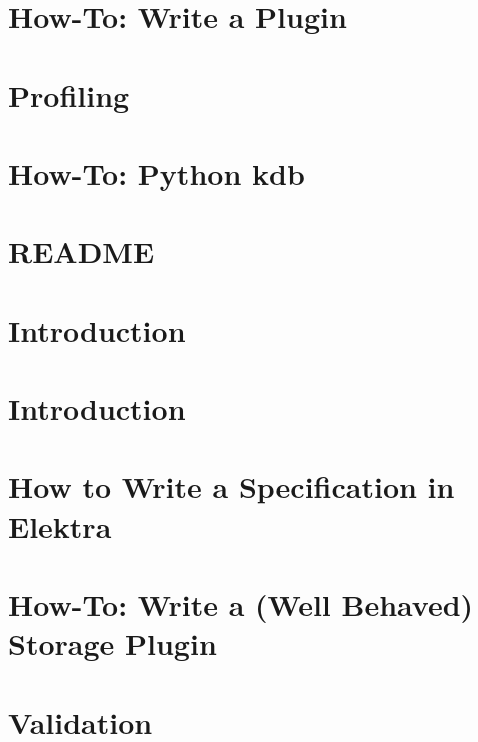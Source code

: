 \let\mypdfximage\pdfximage\def\pdfximage{\immediate\mypdfximage}\documentclass[twoside]{book}
\newcommand{\+}{\discretionary{\mbox{\scriptsize$\hookleftarrow$}}{}{}}
\begin{document}
\chapter{How-\/\+To\+: Write a Plugin}
\label{doc_tutorials_plugins_md}

\chapter{Profiling}
\label{doc_tutorials_profiling_md}

\chapter{How-\/\+To\+: Python kdb}
\label{doc_tutorials_python-kdb_md}

\chapter{README}
\label{md_doc_tutorials_README}

\chapter{Introduction}
\label{doc_tutorials_run_all_tests_with_docker_md}

\chapter{Introduction}
\label{doc_tutorials_run_reformatting_script_with_docker_md}

\chapter{How to Write a Specification in Elektra}
\label{doc_tutorials_specification_md}

\chapter{How-\/\+To\+: Write a (Well Behaved) Storage Plugin}
\label{doc_tutorials_storage-plugins_md}

\chapter{Validation}
\label{doc_tutorials_validation_md}

\end{document}
